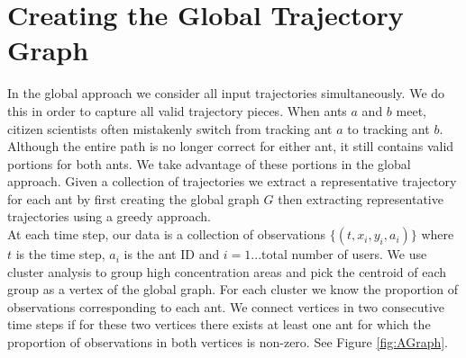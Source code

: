 \documentclass[12pt]{article}
\begin{document}
\section{Creating the Global Trajectory Graph}
In the global approach we consider all input trajectories simultaneously. We do this in order to capture all valid trajectory pieces. When ants $a$ and $b$ meet, citizen scientists often mistakenly switch from tracking ant $a$ to tracking ant $b$.  Although the entire path is no longer correct for either ant, it still contains valid portions for both ants. We take advantage of these portions in the global approach. Given a collection of trajectories we extract a representative trajectory for each ant by first creating the global graph $G$ then extracting representative trajectories using a greedy approach.\\
At each time step, our data is a collection of observations $\{(t,x_i,y_i,a_i)\}$ where $t$ is the time step, $a_i$ is the ant ID and $i=1...$total number of users. We use cluster analysis to group high concentration areas and pick the centroid of each group as a vertex of the global graph. For each cluster we know the proportion of observations corresponding to each ant. We connect vertices in two consecutive time steps if for these two vertices there exists at least one ant for which the proportion of observations in both vertices is non-zero. See Figure \ref{fig:AGraph}.

\end{document}
